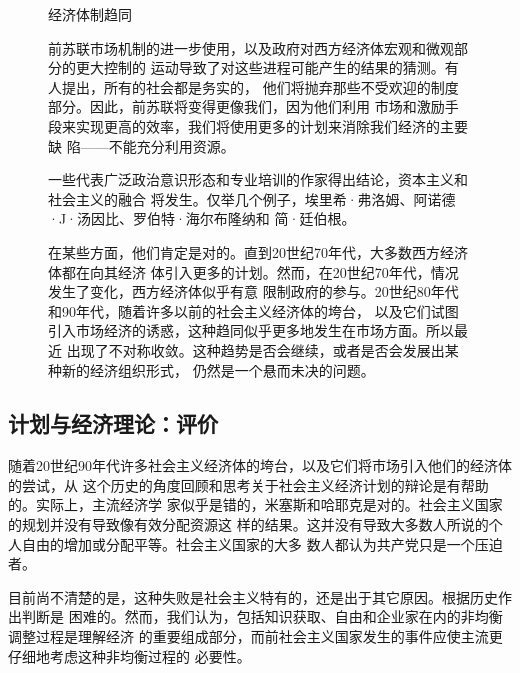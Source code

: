\begin{figure}[ht]
  \centering
  \begin{mybox}{经济体制趋同}
    \begin{multicols}{2}
      前苏联市场机制的进一步使用，以及政府对西方经济体宏观和微观部分的更大控制的
      运动导致了对这些进程可能产生的结果的猜测。有人提出，所有的社会都是务实的，
      他们将抛弃那些不受欢迎的制度部分。因此，前苏联将变得更像我们，因为他们利用
      市场和激励手段来实现更高的效率，我们将使用更多的计划来消除我们经济的主要缺
      陷——不能充分利用资源。

      一些代表广泛政治意识形态和专业培训的作家得出结论，资本主义和社会主义的融合
      将发生。仅举几个例子，埃里希·弗洛姆、阿诺德·J·汤因比、罗伯特·海尔布隆纳和
      简·廷伯根。

      在某些方面，他们肯定是对的。直到20世纪70年代，大多数西方经济体都在向其经济
      体引入更多的计划。然而，在20世纪70年代，情况发生了变化，西方经济体似乎有意
      限制政府的参与。20世纪80年代和90年代，随着许多以前的社会主义经济体的垮台，
      以及它们试图引入市场经济的诱惑，这种趋同似乎更多地发生在市场方面。所以最近
      出现了不对称收敛。这种趋势是否会继续，或者是否会发展出某种新的经济组织形式，
      仍然是一个悬而未决的问题。
    \end{multicols}
  \end{mybox}
\end{figure}

\subsection{计划与经济理论：评价}

随着20世纪90年代许多社会主义经济体的垮台，以及它们将市场引入他们的经济体的尝试，从
这个历史的角度回顾和思考关于社会主义经济计划的辩论是有帮助的。实际上，主流经济学
家似乎是错的，米塞斯和哈耶克是对的。社会主义国家的规划并没有导致像有效分配资源这
样的结果。这并没有导致大多数人所说的个人自由的增加或分配平等。社会主义国家的大多
数人都认为共产党只是一个压迫者。

目前尚不清楚的是，这种失败是社会主义特有的，还是出于其它原因。根据历史作出判断是
困难的。然而，我们认为，包括知识获取、自由和企业家在内的非均衡调整过程是理解经济
的重要组成部分，而前社会主义国家发生的事件应使主流更仔细地考虑这种非均衡过程的
必要性。


